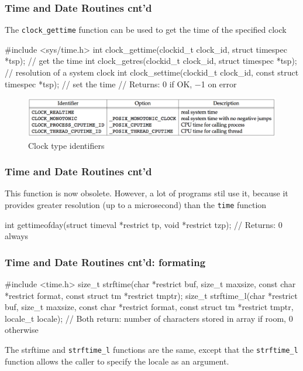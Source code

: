 \documentclass[newPxFont,sthlmFooter,nooffset]{beamer}
\begin{document}
\begin{frame}[containsverbatim,t]
  \frametitle{Time and Date Routines cnt'd}

The \texttt{clock\_gettime} function can be used to get the time of the specified clock

\begin{codedef}
#include <sys/time.h>
int clock_gettime(clockid_t clock_id, struct timespec *tsp); // get the time
int clock_getres(clockid_t clock_id, struct timespec *tsp); // resolution of a system clock
int clock_settime(clockid_t clock_id, const struct timespec *tsp); // set the time
// Returns: 0 if OK, −1 on error  
\end{codedef}

\begin{figure}[h]
  \centering
  \includegraphics[width=\textwidth]{figure/fig6-8_clock.png}
  \caption{Clock type identifiers}
\end{figure}
  
\end{frame}

\begin{frame}[containsverbatim,t]
  \frametitle{Time and Date Routines cnt'd}
This function is now obsolete. However, a lot of programs stil use it, because it provides greater resolution (up to a microsecond) than the \texttt{time} function
\begin{codedef}
int gettimeofday(struct timeval *restrict tp, void *restrict tzp);
// Returns: 0 always
\end{codedef}


\end{frame}


\begin{frame}[containsverbatim,t]
  \frametitle{Time and Date Routines cnt'd: formating}

\begin{codedef}
#include <time.h>
size_t strftime(char *restrict buf, size_t maxsize, const char *restrict format, const struct tm *restrict tmptr);
size_t strftime_l(char *restrict buf, size_t maxsize, const char *restrict format, const struct tm *restrict tmptr, locale_t locale); 
// Both return: number of characters stored in array if room, 0 otherwise
\end{codedef}

The strftime and \texttt{strftime\_l} functions are the same, except that the \texttt{strftime\_l} function allows the caller to specify the locale as an argument.

\end{frame}
\end{document}
